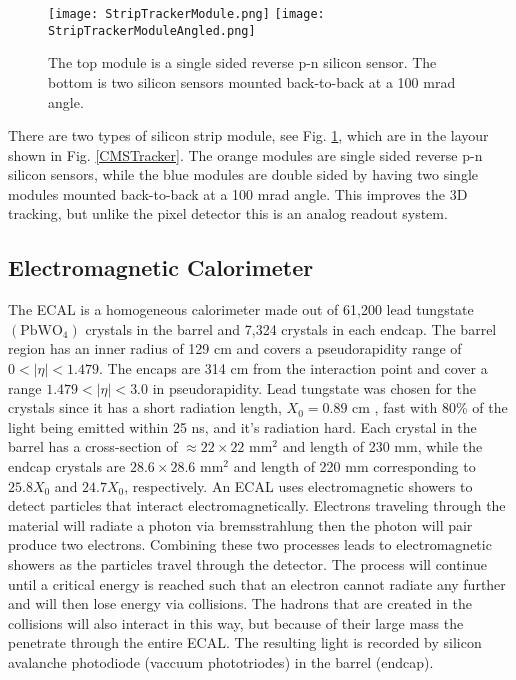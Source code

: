 \begin{figure}[!htb]
	\centering
	\texttt{[image: StripTrackerModule.png]}
	\texttt{[image: StripTrackerModuleAngled.png]}
	\caption[Strip Tracker Module]{The top module is a single sided reverse p-n silicon sensor. The bottom is two silicon sensors mounted back-to-back at a 100 mrad angle.}
 	\label{SiliconStrips} 
\end{figure}

There are two types of silicon strip module, see Fig. \ref{SiliconStrips}, which are in the layour shown in Fig. \ref{CMSTracker}. The orange modules are single sided reverse p-n silicon sensors, while the blue modules are double sided by having two single modules mounted back-to-back at a 100 mrad angle. This improves the 3D tracking, but unlike the pixel detector this is an analog readout system. 

\subsection{Electromagnetic Calorimeter}
\label{sec:ECAL}

The ECAL is a homogeneous calorimeter made out of 61,200 lead tungstate $(\text{PbWO}_4)$ crystals in the barrel and 7,324 crystals in each endcap. The barrel region has an inner radius of 129 cm and covers a pseudorapidity range of $0<|\eta|<1.479$. The encaps are 314 cm from the interaction point and cover a range $1.479<|\eta|<3.0$ in pseudorapidity. Lead tungstate was chosen for the crystals since it has a short radiation length, $X_0=0.89 \text{ cm }$, fast with 80\% of the light being emitted within 25 ns, and it's radiation hard. Each crystal in the barrel has a cross-section of $\approx22\times22 \text{ mm}^2$ and length of 230 mm, while the endcap crystals are $28.6\times28.6 \text{ mm}^2$ and length of 220 mm corresponding to $25.8X_0$ and $24.7X_0$, respectively. An ECAL uses electromagnetic showers to detect particles that interact electromagnetically. Electrons traveling through the material will radiate a photon via bremsstrahlung then the photon will pair produce two electrons. Combining these two processes leads to electromagnetic showers as the particles travel through the detector. The process will continue until a critical energy is reached such that an electron cannot radiate any further and will then lose energy via collisions. The hadrons that are created in the collisions will also interact in this way, but because of their large mass the penetrate through the entire ECAL. The resulting light is recorded by silicon avalanche photodiode (vaccuum phototriodes) in the barrel (endcap). 

